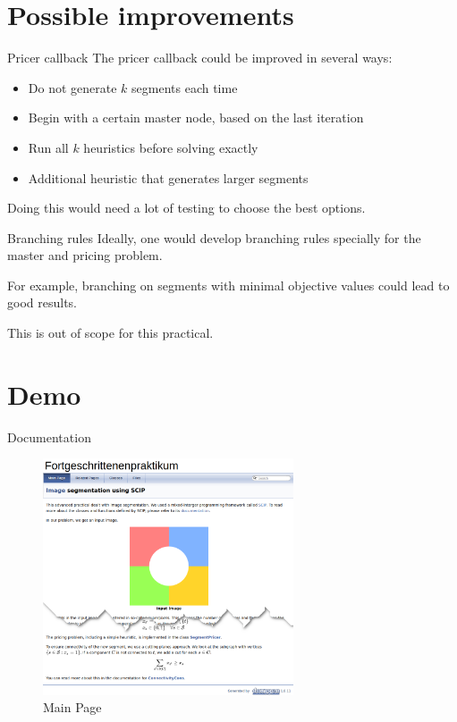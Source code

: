 \documentclass[fleqn]{beamer}
\begin{document}
	\section{Possible improvements}
    \begin{frame}{Pricer callback}
        The pricer callback could be improved in several ways:
        \begin{itemize}
            \item Do not generate $k$ segments each time
            \item Begin with a certain master node, based on the last iteration
            \item Run all $k$ heuristics before solving exactly
            \item Additional heuristic that generates larger segments
        \end{itemize}
    
        Doing this would need a lot of testing to choose the best options.
    \end{frame}
    
    \begin{frame}{Branching rules}
        Ideally, one would develop branching rules specially for the master and pricing problem.     
        
        For example, branching on segments with minimal objective values could lead to good results.
        
        This is out of scope for this practical.
    \end{frame}
    
    \section{Demo}
    \begin{frame}{Documentation}
        \begin{figure}
            \centering
            \includegraphics[width=20em]{mainpage}
            \caption{Main Page}
        \end{figure}
    \end{frame}
\end{document}
